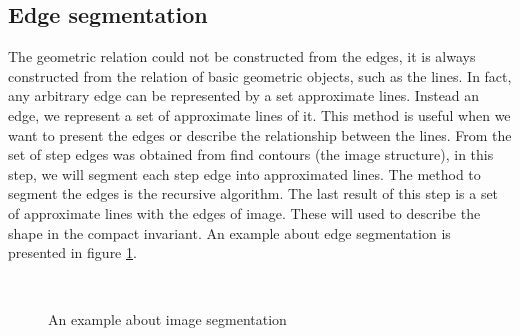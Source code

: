 \subsection{Edge segmentation}
The geometric relation could not be constructed from the edges, it is always constructed from the relation of basic geometric objects, such as the lines.  In fact, any arbitrary edge can be represented by a set approximate lines. Instead an edge, we represent a set of approximate lines of it. This method is useful when we want to present the edges or describe the relationship between the lines. From the set of step edges was obtained from find contours (the image structure), in this step, we will segment each step edge into approximated lines. The method to segment the edges is the recursive algorithm\cite{thacker1995assessing}. The last result of this step is a set of approximate lines with the edges of image. These will used to describe the shape in the compact invariant. An example about edge segmentation is presented in figure \ref{fig:figure_22}.
\begin{figure}[h!]
\centering
{}~~
\caption{An example about image segmentation}
\label{fig:figure_22}
\end{figure}
